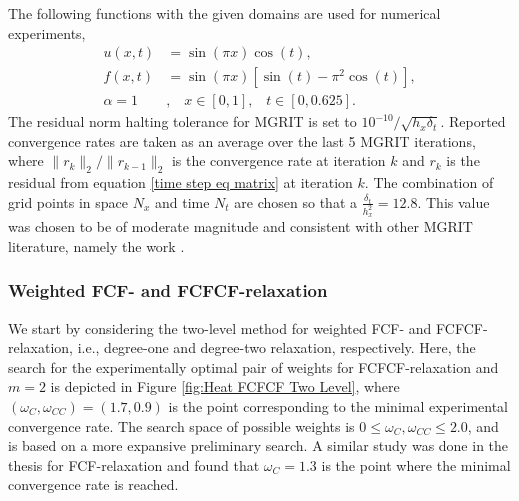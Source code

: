 \documentclass[VANCOUVER,STIX1COL]{WileyNJD-v2}
\begin{document}
The following functions with the given domains are used for numerical experiments,
\begin{subequations}
	\begin{align*}
	u(x, t) &= \sin(\pi x)\cos(t), \\
	f(x,t) &= \sin(\pi x) [\sin(t) - \pi^2 \cos(t)], \\
	\alpha = 1&, \hspace{10pt} x \in [0, 1], \hspace{10pt} t \in [0, 0.625].
	\end{align*}
\end{subequations}
The residual norm halting tolerance for MGRIT is set to $ 10^{-10} / \sqrt{h_x \delta_t}$. 
Reported convergence rates are taken as an average over the last 5 MGRIT
iterations, where $\| r_k\|_2 / \| r_{k-1} \|_2$ is the convergence rate at iteration $k$ and $r_k$ is the residual from equation \eqref{time step eq matrix} at iteration $k$.
The combination of grid points in space $N_x$ and time $N_t$ are chosen so that 
a $\frac{\delta_t}{h_x^2}  = 12.8$.  This value was chosen to be of moderate magnitude and 
consistent with other MGRIT literature, namely the work \cite{Do2016}.

\subsubsection{Weighted FCF- and FCFCF-relaxation}
\label{sec:relax_heat}
We start by considering the two-level method for weighted FCF- and FCFCF-relaxation, i.e., degree-one and 
degree-two relaxation, respectively. Here, the search for the experimentally optimal pair of weights for FCFCF-relaxation and $m=2$ is 
depicted in Figure \ref{fig:Heat FCFCF Two Level}, where $(\omega_{C}, \omega_{CC}) = (1.7, 0.9)$ is the 
point corresponding to the minimal experimental 
convergence rate.  The search space of possible weights is  
$0 \leq \omega_{C}, \omega_{CC} \leq 2.0$, and is based on a more expansive preliminary search.  
A similar study was done in the thesis \cite{Su2019_v2} for 
FCF-relaxation and found that $\omega_{C} = 1.3$ is the point where the minimal 
convergence rate is reached.
\end{document}
